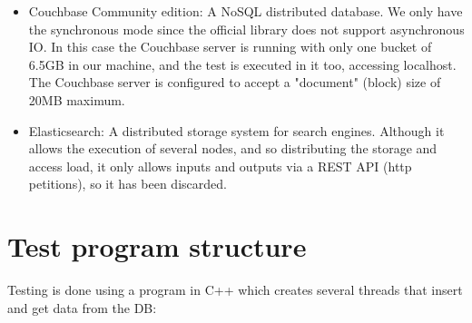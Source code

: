 \documentclass[12pt]{article}
\begin{document}
\begin{itemize}
    \item Couchbase Community edition: A NoSQL distributed database. We only have the synchronous mode since the official library does not support asynchronous IO. In this case the Couchbase server is running with only one bucket of 6.5GB in our machine, and the test is executed in it too, accessing localhost. The Couchbase server is configured to accept a "document" (block) size of 20MB maximum.
    \item Elasticsearch: A distributed storage system for search engines. Although it allows the execution of several nodes, and so distributing the storage and access load, it only allows inputs and outputs via a REST API (http petitions), so it has been discarded.
\end{itemize}

\section{Test program structure}

Testing is done using a program in C++ which creates several threads that insert and get data from the DB:
\end{document}
